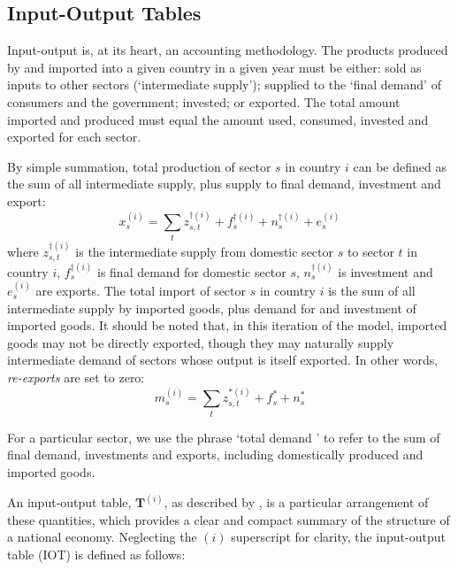 \documentclass[a4paper]{article}
\begin{document}
\subsection{Input-Output Tables} \label{sec:iots}
Input-output is, at its heart, an accounting methodology.
The products produced by and imported into a given country in a given year must be either: sold as inputs to other sectors (`intermediate supply'); supplied to the `final demand' of consumers and the government; invested; or exported.
The total amount imported and produced must equal the amount used, consumed, invested and exported for each sector.

By simple summation, total production of sector $s$ in country $i$ can be defined as the sum of all intermediate supply, plus supply to final demand, investment and export:
\begin{equation}\label{eqn:x}
x_s^{(i)}=\sum\limits_{t}z_{s,t}^{\dagger(i)} + f_s^{\dagger(i)} + n_s^{\dagger(i)} + e_s^{(i)}
\end{equation}
where $z_{s,t}^{\dagger(i)}$ is the intermediate supply from domestic sector $s$ to sector $t$ in country $i$, $f_s^{\dagger(i)}$ is final demand for domestic sector $s$, $n_s^{\dagger(i)}$ is investment and $e_s^{(i)}$ are exports.
The total import of sector $s$ in country $i$ is the sum of all intermediate supply by imported goods, plus demand for and investment of imported goods. 
It should be noted that, in this iteration of the model, imported goods may not be directly exported, though they may naturally supply intermediate demand of sectors whose output is itself exported.
In other words, \textit{re-exports} are set to zero:
\begin{equation}\label{eqn:m}
m_s^{(i)}=\sum\limits_{t}z_{s,t}^{*(i)} + f_s^* + n_s^*
\end{equation}

For a particular sector, we use the phrase `total demand '  to refer to the sum of final demand, investments and exports, including domestically produced and imported goods.

An input-output table, $\boldsymbol{T}^{(i)}$, as described by \textcite{miller_input-output_1985}, is a particular arrangement of these quantities, which provides a clear and compact summary of the structure of a national economy.
Neglecting the $(i)$ superscript for clarity, the input-output table (IOT) is defined as follows:
\end{document}
